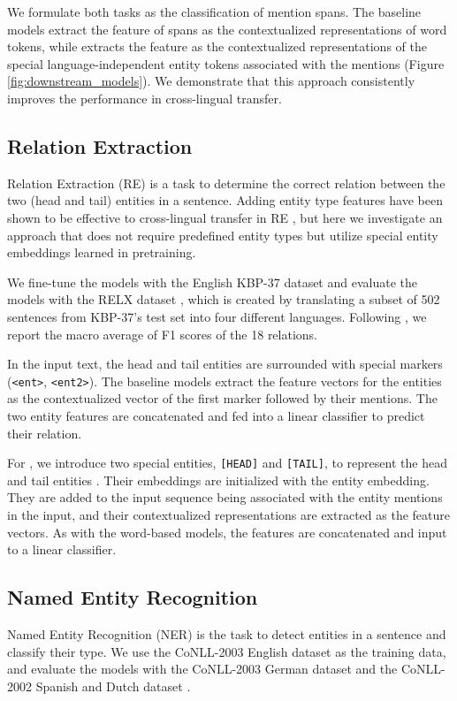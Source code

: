 \documentclass[11pt]{article}
\newcommand{\minisection}[1]{\noindent{\bf {#1}.}}
\begin{document}
We formulate both tasks as the classification of mention spans.
The baseline models extract the feature of spans as the contextualized representations of word tokens, while \mlukeE{} extracts the feature as the contextualized representations of the special language-independent entity tokens associated with the mentions (Figure \ref{fig:downstream_models}).
We demonstrate that this approach consistently improves the performance in cross-lingual transfer.

\subsection{Relation Extraction}
\label{subsec:re}
Relation Extraction (RE) is a task to determine the correct relation between the two (head and tail) entities in a sentence.
Adding entity type features have been shown to be effective to cross-lingual transfer in RE \citep{subburathinam-etal-2019-cross,ahmad2020gatf}, but here we investigate an approach that does not require predefined entity types but utilize special entity embeddings learned in pretraining.

\minisection{Datasets}
We fine-tune the models with the English KBP-37 dataset \citep{Zhang2015RelationCV} and evaluate the models with the RELX dataset \citep{koksal-ozgur-2020-relx}, which is created by translating a subset of 502 sentences from KBP-37’s test set into four different languages.
Following \citet{koksal-ozgur-2020-relx}, we report the macro average of F1 scores of the 18 relations.

\minisection{Models}
In the input text, the head and tail entities are surrounded with special markers (\texttt{<ent>}, \texttt{<ent2>}).
The baseline models extract the feature vectors for the entities as the contextualized vector of the first marker followed by their mentions. The two entity features are concatenated and fed into a linear classifier to predict their relation.

For \mlukeE{}, we introduce two special entities, \texttt{[HEAD]} and \texttt{[TAIL]}, to represent the head and tail entities \citep{yamada-etal-2020-luke}. Their embeddings are initialized with the entity \mask{} embedding.
They are added to the input sequence being associated with the entity mentions in the input, and their contextualized representations are extracted as the feature vectors.
As with the word-based models, the features are concatenated and input to a linear classifier.


\subsection{Named Entity Recognition}
Named Entity Recognition (NER) is the task to detect entities in a sentence and classify their type.
We use the CoNLL-2003 English dataset \citep{TjongKimSang-DeMeulder:2003:CONLL} as the training data, and evaluate the models with the CoNLL-2003 German dataset and the CoNLL-2002 Spanish and Dutch dataset \citep{tjong-kim-sang-2002-introduction}.
\end{document}
